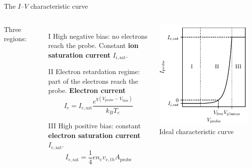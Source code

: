 \documentclass[10pt]{beamer}
\newcommand{\electronsaturationcurrent}[0]{\ensuremath{I_{e,{\mathrm{sat}}}}}
\newcommand{\biasvoltage}{\ensuremath{V_{\mathrm{bias}}}}
\newcommand{\probevoltage}{\ensuremath{V_{\mathrm{probe}}}}
\begin{document}
\begin{frame}{The $I$--$V$ characteristic curve}
    \begin{columns}
        Three regions:
        \begin{enumerate}
            \item[I] High negative bias: no electrons reach the probe. Constant \textbf{ion saturation current} $I_{i,\mathrm{sat}}$.
            \item[II] Electron retardation regime: part of the electrons reach the probe. \textbf{Electron current}\, 
            \begin{equation*}
                I_e = \electronsaturationcurrent \frac{e^{q(\probevoltage - \biasvoltage)}}{k_B T_e}
            \end{equation*}
            \item[III] High positive bias: constant \textbf{electron saturation current} $\electronsaturationcurrent$.
            \begin{equation*}
                \electronsaturationcurrent = \frac{1}{4}e n_e v_{e,th} A_{\mathrm{probe}}
            \end{equation*}
        \end{enumerate}
        \centering
        \includegraphics[scale=1]{../figures/langmuir_characteristic.pdf}
        \small Ideal characteristic curve
    \end{columns}
\end{frame}
\end{document}
